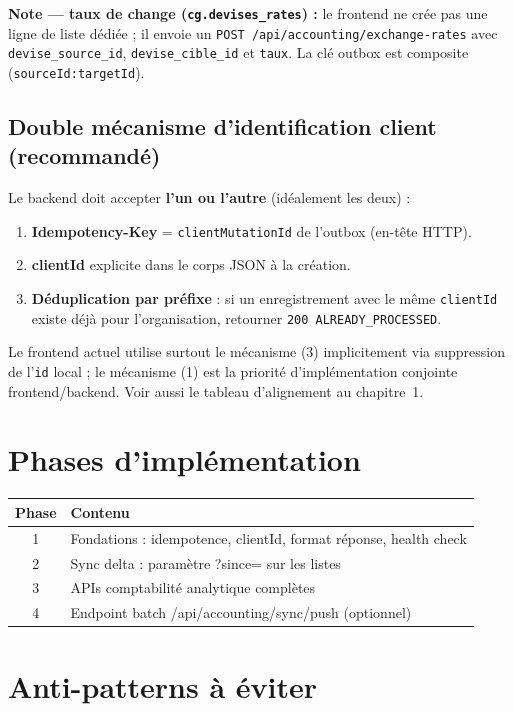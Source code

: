 \documentclass[12pt,a4paper]{report}
\begin{document}
\textbf{Note --- taux de change (\texttt{cg.devises\_rates}) :} le frontend ne crée pas une ligne de liste dédiée ; il envoie un \texttt{POST /api/accounting/exchange-rates} avec \texttt{devise\_source\_id}, \texttt{devise\_cible\_id} et \texttt{taux}. La clé outbox est composite (\texttt{sourceId:targetId}).

\subsection{Double mécanisme d'identification client (recommandé)}

Le backend doit accepter \textbf{l'un ou l'autre} (idéalement les deux) :
\begin{enumerate}
  \item \textbf{Idempotency-Key} = \texttt{clientMutationId} de l'outbox (en-tête HTTP).
  \item \textbf{clientId} explicite dans le corps JSON à la création.
  \item \textbf{Déduplication par préfixe} : si un enregistrement avec le même \texttt{clientId} existe déjà pour l'organisation, retourner \texttt{200 ALREADY\_PROCESSED}.
\end{enumerate}

Le frontend actuel utilise surtout le mécanisme (3) implicitement via suppression de l'\texttt{id} local ; le mécanisme (1) est la priorité d'implémentation conjointe frontend/backend. Voir aussi le tableau d'alignement au chapitre~1.

\section{Phases d'implémentation}

\begin{longtable}{@{}cp{10cm}@{}}
\hline
\textbf{Phase} & \textbf{Contenu} \\
\hline
\endhead
1 & Fondations : idempotence, clientId, format réponse, health check \\
\hline
2 & Sync delta : paramètre ?since= sur les listes \\
\hline
3 & APIs comptabilité analytique complètes \\
\hline
4 & Endpoint batch /api/accounting/sync/push (optionnel) \\
\hline
\end{longtable}

\section{Anti-patterns à éviter}
\end{document}
